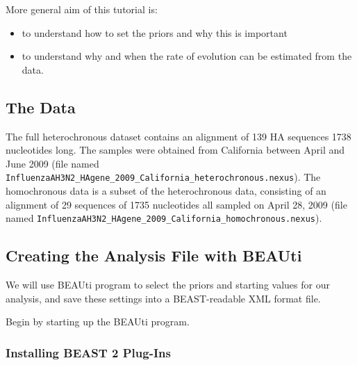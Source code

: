 \documentclass[11pt]{article}
\begin{document}
More general aim of this tutorial is:
\begin{itemize}
	\item to understand how to set the priors and why this is important
	\item to understand why and when the rate of evolution can be estimated from the data.
\end{itemize}



\bigskip
\subsection{The Data}

The full heterochronous dataset contains an alignment of 139 HA sequences 1738 nucleotides long. The samples were obtained from California between April and June 2009 (file named \\
\texttt{InfluenzaAH3N2\_HAgene\_2009\_California\_heterochronous.nexus}). The homochronous data is a subset of the heterochronous data, consisting of an alignment of 29 sequences of 1735 nucleotides all sampled on April 28, 2009 (file named \texttt{InfluenzaAH3N2\_HAgene\_2009\_California\_homochronous.nexus}). 




\bigskip
\subsection{Creating the Analysis File with BEAUti}

We will use BEAUti program to select the priors and starting values for our analysis, and save these settings into a BEAST-readable XML format file. 

\begin{framed}
Begin by starting up the BEAUti program.
\end{framed}



\bigskip
\subsubsection{Installing BEAST 2 Plug-Ins}
\end{document}
